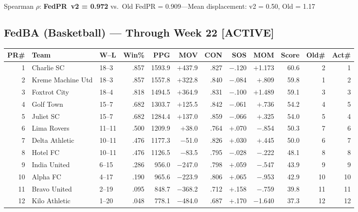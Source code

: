 \documentclass[11pt,a4paper]{article}
\begin{document}
\noindent Spearman $\rho$: \textbf{FedPR~v2 = 0.972} vs.\ Old FedPR = 0.909\quad---\quad Mean displacement: v2 = 0.50, Old = 1.17


\subsection{FedBA (Basketball) --- Through Week 22 [ACTIVE]}

\begin{table}[H]
\centering\small
\begin{tabular}{@{}rl l r r r r r r r r r@{}}
\toprule
\textbf{PR\#} & \textbf{Team} & \textbf{W--L} & \textbf{Win\%} & \textbf{PPG} & \textbf{MOV} & \textbf{CON} & \textbf{SOS} & \textbf{MOM} & \textbf{Score} & \textbf{Old\#} & \textbf{Act\#}\\
\midrule
1 & Charlie SC & 18--3 & .857 & 1593.9 & $+$437.9 & .827 & $-$.120 & $+$1.173 & 60.6 & 2 & 1\\
2 & Kreme Machine Utd & 18--3 & .857 & 1557.8 & $+$322.8 & .840 & $-$.084 & $+$.809 & 59.8 & 1 & 2\\
3 & Foxtrot City & 18--4 & .818 & 1494.5 & $+$364.9 & .831 & $-$.100 & $+$1.489 & 59.1 & 3 & 3\\
4 & Golf Town & 15--7 & .682 & 1303.7 & $+$125.5 & .842 & $-$.061 & $+$.736 & 54.2 & 4 & 5\\
5 & Juliet SC & 15--7 & .682 & 1284.4 & $+$137.0 & .859 & $-$.066 & $+$.325 & 54.0 & 5 & 4\\
6 & Lima Rovers & 11--11 & .500 & 1209.9 & $+$38.0 & .764 & $+$.070 & $-$.854 & 50.3 & 7 & 6\\
7 & Delta Athletic & 10--11 & .476 & 1177.3 & $-$51.0 & .826 & $+$.030 & $+$.445 & 50.0 & 6 & 7\\
8 & Hotel FC & 10--11 & .476 & 1126.5 & $-$83.5 & .795 & $-$.028 & $-$.222 & 48.1 & 8 & 8\\
9 & India United & 6--15 & .286 & 956.0 & $-$247.0 & .798 & $+$.059 & $-$.547 & 43.9 & 9 & 9\\
10 & Alpha FC & 4--17 & .190 & 965.6 & $-$223.9 & .806 & $+$.065 & $-$.953 & 42.9 & 10 & 10\\
11 & Bravo United & 2--19 & .095 & 848.7 & $-$368.2 & .712 & $+$.158 & $-$.759 & 39.8 & 11 & 11\\
12 & Kilo Athletic & 1--20 & .048 & 778.1 & $-$484.0 & .687 & $+$.170 & $-$1.640 & 37.3 & 12 & 12\\
\bottomrule
\end{tabular}
\end{table}
\end{document}

